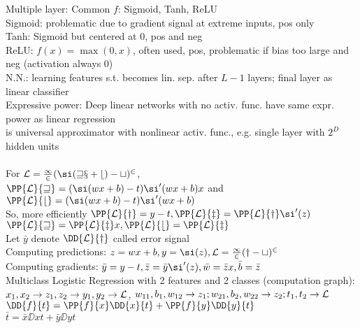 \documentclass[10pt]{CheatSheet/hw}
\begin{document}
\begin{multicols*}{5}
Multiple layer:
\vspace{-5pt}
\vspace{-5pt}
Common $f$: Sigmoid, Tanh, ReLU\\
Sigmoid: problematic due to gradient signal at extreme inputs, pos only\\
Tanh: Sigmoid but centered at 0, pos and neg\\
ReLU: $f(x)=\max(0,x)$, often used, pos, problematic if bias too large and neg (activation always 0)\\
N.N.: learning features s.t. becomes lin. sep. after $L-1$ layers; final layer as linear classifier\\
Expressive power: Deep linear networks with no activ. func. have same expr. power as linear regression\\
is universal approximator with nonlinear activ. func., e.g. single layer with $2^D$ hidden units\\
\\
For $\cal{L}=\frac12(\si(wx+b)-t)^2$,\\
$\PP{\cal{L}}{w}=(\si(wx+b)-t)\si'(wx+b)x$ and\\
$\PP{\cal{L}}{b}=(\si(wx+b)-t)\si'(wx+b)$\\
So, more efficiently $\PP{\cal{L}}{y}=y-t, \PP{\cal{L}}{z}=\PP{\cal{L}}{y}\si'(z)$\\
$\PP{\cal{L}}{w}=\PP{\cal{L}}{z}x, \PP{\cal{L}}{b}=\PP{\cal{L}}{z}$\\
Let $\bar{y}$ denote $\DD{\cal{L}}{y}$ called error signal\\
Computing predictions: $z=wx+b, y=\si(z), \cal{L}=\frac12(y-t)^2$\\
Computing gradients: $\bar{y}=y-t, \bar{z}=\bar{y}\si'(z), \bar{w}=\bar{z}x, \bar{b}=\bar{z}$\\
Multiclass Logistic Regression with 2 features and 2 classes (computation graph): \\
$x_1,x_2\to z_1,z_2\to y_1,y_2\to \cal{L}$, $w_{11}, b_1, w_{12}\to z_1; w_{21}, b_2, w_{22}\to z_2; t_1,t_2\to\cal{L}$\\
$\DD{f}{t}=\PP{f}{x}\DD{x}{t}+\PP{f}{y}\DD{y}{t}$\\
$\bar{t}=\bar{x}\DD{x}{t}+\bar{y}\DD{y}{t}$\\

\end{multicols*}
\end{document}
